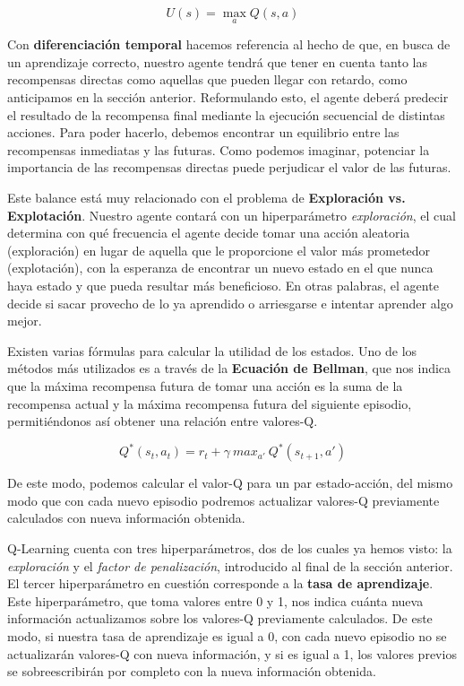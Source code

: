 \begin{equation}
    U(s) = \max_{a}Q(s, a)
\end{equation}

Con \textbf{diferenciación temporal} hacemos referencia al hecho de que, en busca de un aprendizaje correcto, nuestro agente tendrá que tener en cuenta tanto las recompensas directas como aquellas que pueden llegar con retardo, como anticipamos en la sección anterior. Reformulando esto, el agente deberá predecir el resultado de la recompensa final mediante la ejecución secuencial de distintas acciones. Para poder hacerlo, debemos encontrar un equilibrio entre las recompensas inmediatas y las futuras. Como podemos imaginar, potenciar la importancia de las recompensas directas puede perjudicar el valor de las futuras.

Este balance está muy relacionado con el problema de \textbf{Exploración vs. Explotación}. Nuestro agente contará con un hiperparámetro \textit{exploración}, el cual determina con qué frecuencia el agente decide tomar una acción aleatoria (exploración) en lugar de aquella que le proporcione el valor más prometedor (explotación), con la esperanza de encontrar un nuevo estado en el que nunca haya estado y que pueda resultar más beneficioso. En otras palabras, el agente decide si sacar provecho de lo ya aprendido o arriesgarse e intentar aprender algo mejor.

Existen varias fórmulas para calcular la utilidad de los estados. Uno de los métodos más utilizados es a través de la \textbf{Ecuación de Bellman}, que nos indica que la máxima recompensa futura de tomar una acción es la suma de la recompensa actual y la máxima recompensa futura del siguiente episodio, permitiéndonos así obtener una relación entre valores-Q.

\begin{equation}
    Q^*(s_{t}, a_{t}) = r_{t} + \gamma\ max_{a'}\ Q^*(s_{t+1}, a')
\end{equation}

De este modo, podemos calcular el valor-Q para un par estado-acción, del mismo modo que con cada nuevo episodio podremos actualizar valores-Q previamente calculados con nueva información obtenida.

Q-Learning cuenta con tres hiperparámetros, dos de los cuales ya hemos visto: la \textit{exploración} y el \textit{factor de penalización}, introducido al final de la sección anterior. El tercer hiperparámetro en cuestión corresponde a la \textbf{tasa de aprendizaje}. Este hiperparámetro, que toma valores entre 0 y 1, nos indica cuánta nueva información actualizamos sobre los valores-Q previamente calculados. De este modo, si nuestra tasa de aprendizaje es igual a 0, con cada nuevo episodio no se actualizarán valores-Q con nueva información, y si es igual a 1, los valores previos se sobreescribirán por completo con la nueva información obtenida.

